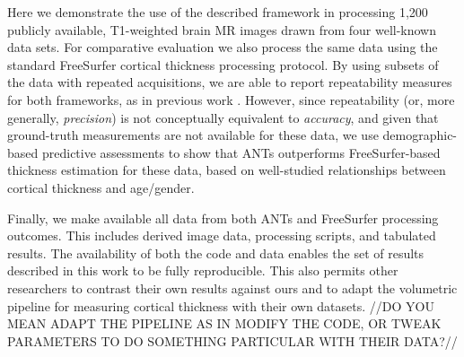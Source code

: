 Here we demonstrate the use of the described framework
in processing 1,200 publicly available, T1-weighted brain MR images drawn from
four well-known data sets.
For comparative evaluation we also process the same data using the
standard FreeSurfer cortical thickness processing protocol.  By using
subsets of the data with repeated acquisitions, we are able to report repeatability measures
for both frameworks, as in previous work
\citep{clarkson2011,jovicich2013}.  However, since repeatability (or, more generally, {\it precision})
is not conceptually equivalent to {\it accuracy}, and given that ground-truth
measurements are not available for these data, we use demographic-based
predictive assessments to show that ANTs outperforms FreeSurfer-based
thickness estimation for these data, based on well-studied relationships between
cortical thickness and age/gender.

Finally, we make available all data from both ANTs and FreeSurfer 
processing outcomes.  This includes derived image data, processing scripts, 
and tabulated results.  The availability of both the code and data enables
the set of results described in this work to be fully reproducible.  This
also permits other researchers to contrast their own results against
ours and to adapt the volumetric pipeline for measuring
cortical thickness with their own datasets.  //DO YOU MEAN ADAPT THE PIPELINE AS IN
  MODIFY THE CODE, OR TWEAK PARAMETERS TO DO SOMETHING PARTICULAR WITH THEIR DATA?//



